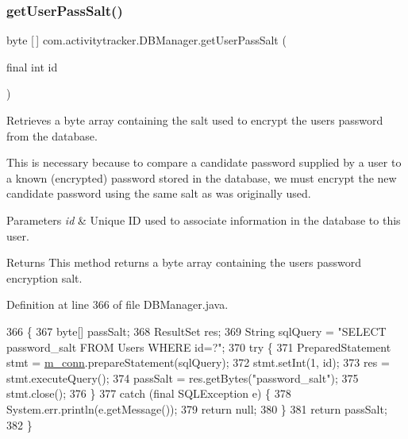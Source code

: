 \subsubsection{\texorpdfstring{get\+User\+Pass\+Salt()}{getUserPassSalt()}}
{\footnotesize\ttfamily byte \mbox{[}$\,$\mbox{]} com.\+activitytracker.\+D\+B\+Manager.\+get\+User\+Pass\+Salt (\begin{DoxyParamCaption}\item[{final int}]{id }\end{DoxyParamCaption})}

Retrieves a byte array containing the salt used to encrypt the user\textquotesingle{}s password from the database.

This is necessary because to compare a candidate password supplied by a user to a known (encrypted) password stored in the database, we must encrypt the new candidate password using the same salt as was originally used.


\begin{DoxyParams}{Parameters}
{\em id} & Unique ID used to associate information in the database to this user.\\
\hline
\end{DoxyParams}
\begin{DoxyReturn}{Returns}
This method returns a byte array containing the user\textquotesingle{}s password encryption salt. 
\end{DoxyReturn}


Definition at line 366 of file D\+B\+Manager.\+java.


\begin{DoxyCode}
366                                                 \{
367         byte[] passSalt;
368         ResultSet res;
369         String sqlQuery = \textcolor{stringliteral}{"SELECT password\_salt FROM Users WHERE id=?"};
370         \textcolor{keywordflow}{try} \{
371             PreparedStatement stmt = \mbox{\hyperlink{classcom_1_1activitytracker_1_1_d_b_manager_a064088d13ac09eb147fdc19268771521}{m\_conn}}.prepareStatement(sqlQuery);
372             stmt.setInt(1, \textcolor{keywordtype}{id});
373             res = stmt.executeQuery();
374             passSalt = res.getBytes(\textcolor{stringliteral}{"password\_salt"});
375             stmt.close();
376         \}
377         \textcolor{keywordflow}{catch} (\textcolor{keyword}{final} SQLException e) \{
378             System.err.println(e.getMessage());
379             \textcolor{keywordflow}{return} null;
380         \}
381         \textcolor{keywordflow}{return} passSalt;
382     \}
\end{DoxyCode}
\mbox{\label{classcom_1_1activitytracker_1_1_d_b_manager_a4e695c111b877cfd1d918602551f65a1}} 
